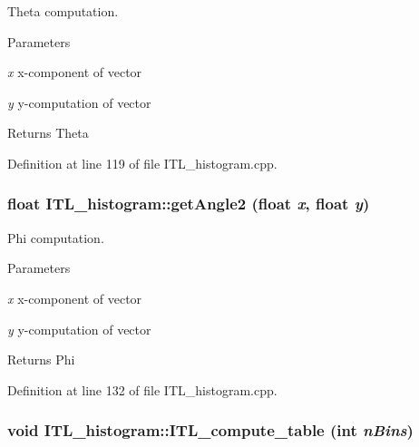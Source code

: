 Theta computation. 


\begin{DoxyParams}{Parameters}
\item[{\em x}]x-\/component of vector \item[{\em y}]y-\/computation of vector \end{DoxyParams}
\begin{DoxyReturn}{Returns}
Theta 
\end{DoxyReturn}


Definition at line 119 of file ITL\_\-histogram.cpp.

\hypertarget{classITL__histogram_a9734482a7ba043f0c0214518bd68fed3}{
\subsubsection[{getAngle2}]{\setlength{\rightskip}{0pt plus 5cm}float ITL\_\-histogram::getAngle2 (float {\em x}, \/  float {\em y})}}
\label{classITL__histogram_a9734482a7ba043f0c0214518bd68fed3}


Phi computation. 


\begin{DoxyParams}{Parameters}
\item[{\em x}]x-\/component of vector \item[{\em y}]y-\/computation of vector \end{DoxyParams}
\begin{DoxyReturn}{Returns}
Phi 
\end{DoxyReturn}


Definition at line 132 of file ITL\_\-histogram.cpp.

\hypertarget{classITL__histogram_a766a51e4f00bdbca0147a824295a42a3}{
\subsubsection[{ITL\_\-compute\_\-table}]{\setlength{\rightskip}{0pt plus 5cm}void ITL\_\-histogram::ITL\_\-compute\_\-table (int {\em nBins})}}
\label{classITL__histogram_a766a51e4f00bdbca0147a824295a42a3}


